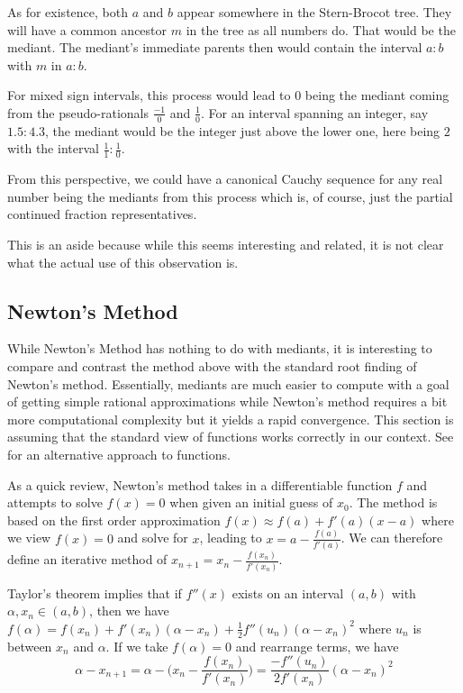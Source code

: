 \documentclass[12pt]{article}
\begin{document}
As for existence, both $a$ and $b$ appear somewhere in the Stern-Brocot tree. They will have a common ancestor $m$ in the tree as all numbers do. That would be the mediant. The mediant's immediate parents then would contain the interval $a:b$ with $m$ in $a:b$.

For mixed sign intervals, this process would lead to $0$ being the mediant coming from the pseudo-rationals $\frac{-1}{0}$ and $\frac{1}{0}$. For an interval spanning an integer, say $1.5:4.3$, the mediant would be the integer just above the lower one,  here being $2$ with the interval $\frac{1}{1}: \frac{1}{0}$.

From this perspective, we could have a canonical Cauchy sequence for any real number being the mediants from this process which is, of course, just the partial continued fraction representatives. 

This is an aside because while this seems interesting and related, it is not clear what the actual use of this observation is. 

\subsection{Newton's Method}

While Newton's Method has nothing to do with mediants, it is interesting to compare and contrast the method above with the standard root finding of Newton's method. Essentially, mediants are much easier to compute with a goal of getting simple rational approximations while Newton's method requires a bit more computational complexity but it yields a rapid convergence. This section is assuming that the standard view of functions works correctly in our context. See \cite{taylor23funora} for an alternative approach to functions.

As a quick review, Newton's method takes in a differentiable function $f$ and attempts to solve $f(x)= 0$ when given an initial guess of $x_0$. The method is based on the first order approximation $f(x) \approx f(a) + f'(a) (x-a) $ where we view $f(x) =0$ and solve for $x$, leading to $x = a - \tfrac{f(a)}{f'(a)}$. We can therefore define an iterative method of $x_{n+1} = x_n - \tfrac{f(x_n)}{f'(x_n)}$.

Taylor's theorem implies that if $f''(x)$ exists on an interval $(a,b)$ with $\alpha, x_n \in (a,b)$, then we have $f(\alpha) = f(x_n) +f'(x_n)(\alpha - x_n) + \frac{1}{2} f''(u_n) (\alpha - x_n)^2$ where $u_n$ is between $x_n$ and $\alpha$. If we take $f(\alpha) = 0$ and rearrange terms, we have $$\alpha - x_{n+1} = \alpha - \bigg(x_n - \frac{f(x_n)}{f'(x_n)}\bigg) = \frac{-f''(u_n)}{2 f'(x_n) } (\alpha - x_n)^2$$
\end{document}
